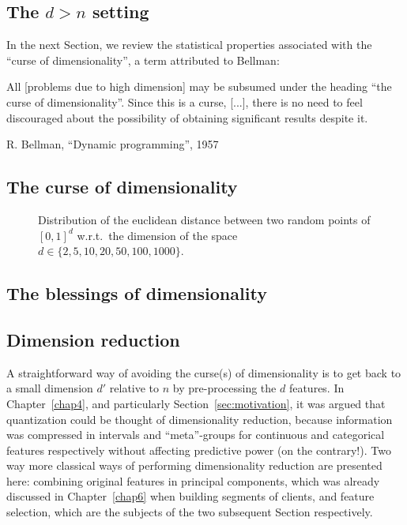 \subsection{The $d > n$ setting}

In the next Section, we review the statistical properties associated with the ``curse of dimensionality'', a term attributed to Bellman:
\epigraph{All [problems due to high dimension] may be subsumed under the heading “the curse of dimensionality”. Since this is a curse, [...], there is no need to feel discouraged about the possibility of obtaining significant results despite it.}{R. Bellman, ``Dynamic programming'', 1957}

\subsection{The curse of dimensionality}



\begin{figure}[!ht]
\centering
\resizebox{\textwidth}{!}{}
\caption{Distribution of the euclidean distance between two random points of $[0,1]^d$ w.r.t.\ the dimension of the space $d \in \{ 2, 5, 10, 20, 50, 100, 1000 \}$.}
\label{fig:distance}
\end{figure}

\subsection{The blessings of dimensionality}


\subsection{Dimension reduction}

A straightforward way of avoiding the curse(s) of dimensionality is to get back to a small dimension $d'$ relative to $n$ by pre-processing the $d$ features. In Chapter~\ref{chap4}, and particularly Section~\ref{sec:motivation}, it was argued that quantization could be thought of dimensionality reduction, because information was compressed in intervals and ``meta''-groups for continuous and categorical features respectively without affecting predictive power (on the contrary!). Two way more classical ways of performing dimensionality reduction are presented here: combining original features in principal components, which was already discussed in Chapter~\ref{chap6} when building segments of clients, and feature selection, which are the subjects of the two subsequent Section respectively.

